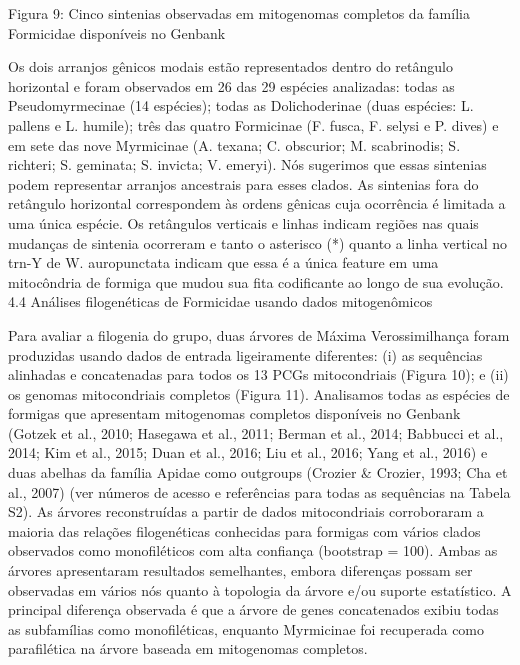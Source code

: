 \documentclass[../DISSERTACAO_MAIN.tex]{subfiles}
\begin{document}
	
	
	
	
	
	
	
	
	
	Figura 9: Cinco sintenias observadas em mitogenomas completos da família Formicidae disponíveis no Genbank
	
	Os dois arranjos gênicos modais estão representados dentro do retângulo horizontal e foram observados em 26 das 29 espécies analizadas: todas as Pseudomyrmecinae (14 espécies); todas as Dolichoderinae (duas espécies: L. pallens e L. humile); três das quatro Formicinae (F. fusca, F. selysi e P. dives) e em sete das nove Myrmicinae (A. texana; C. obscurior; M. scabrinodis; S. richteri; S. geminata; S. invicta; V. emeryi). Nós sugerimos que essas sintenias podem representar arranjos ancestrais para esses clados. As sintenias fora do retângulo horizontal correspondem às ordens gênicas cuja ocorrência é limitada a uma única espécie. Os retângulos verticais e linhas indicam regiões nas quais mudanças de sintenia ocorreram e tanto o asterisco (*) quanto a linha vertical no trn-Y de W. auropunctata indicam que essa é a única feature em uma mitocôndria de formiga que mudou sua fita codificante ao longo de sua evolução.
	4.4 Análises filogenéticas de Formicidae usando dados mitogenômicos
	
	Para avaliar a filogenia do grupo, duas árvores de Máxima Verossimilhança foram produzidas usando dados de entrada ligeiramente diferentes: (i) as sequências alinhadas e concatenadas para todos os 13 PCGs mitocondriais (Figura 10); e (ii) os genomas mitocondriais completos (Figura 11). Analisamos todas as espécies de formigas que apresentam mitogenomas completos disponíveis no Genbank (Gotzek et al., 2010; Hasegawa et al., 2011; Berman et al., 2014; Babbucci et al., 2014; Kim et al., 2015; Duan et al., 2016; Liu et al., 2016; Yang et al., 2016) e duas abelhas da família Apidae como outgroups (Crozier \& Crozier, 1993; Cha et al., 2007) (ver números de acesso e referências para todas as sequências na Tabela S2). As árvores reconstruídas a partir de dados mitocondriais corroboraram a maioria das relações filogenéticas conhecidas para formigas com vários clados observados como monofiléticos com alta confiança (bootstrap = 100). Ambas as árvores apresentaram resultados semelhantes, embora diferenças possam ser observadas em vários nós quanto à topologia da árvore e/ou suporte estatístico. A principal diferença observada é que a árvore de genes concatenados exibiu todas as subfamílias como monofiléticas, enquanto Myrmicinae foi recuperada como parafilética na árvore baseada em mitogenomas completos. 
	
\end{document}

